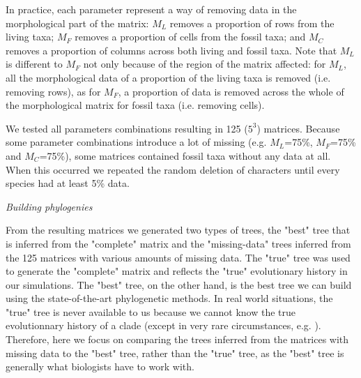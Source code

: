 \documentclass[12pt,letterpaper]{article}
\renewcommand{\subsection}[1]{%
\bigskip
\begin{center}
\begin{large}
\normalfont\itshape #1
\end{large}
\end{center}}
\begin{document}
In practice, each parameter represent a way of removing data in the morphological part of the matrix: $M_{L}$ removes a proportion of rows from the living taxa; $M_{F}$ removes a proportion of cells from the fossil taxa; and $M_{C}$ removes a proportion of columns across both living and fossil taxa.
Note that $M_{L}$ is different to $M_{F}$ not only because of the region of the matrix affected: for $M_{L}$, all the morphological data of a proportion of the living taxa is removed (i.e. removing rows), as for $M_{F}$, a proportion of data is removed across the whole of the morphological matrix for fossil taxa (i.e. removing cells).

We tested all parameters combinations resulting in 125 ($5^3$) matrices.
Because some parameter combinations introduce a lot of missing (e.g. $M_L$=75\%, $M_F$=75\% and $M_C$=75\%), some matrices contained fossil taxa without any data at all.
When this occurred we repeated the random deletion of characters until every species had at least 5\% data.

\subsection{Building phylogenies}
From the resulting matrices we generated two types of trees, the "best" tree that is inferred from the "complete" matrix and the "missing-data" trees inferred from the 125 matrices with various amounts of missing data.
The "true" tree was used to generate the "complete" matrix and reflects the "true" evolutionary history in our simulations.
The "best" tree, on the other hand, is the best tree we can build using the state-of-the-art phylogenetic methods.
In real world situations, the "true" tree is never available to us because we cannot know the true evolutionnary history of a clade (except in very rare circumstances, e.g. \citet{rozen2005}).
Therefore, here we focus on comparing the trees inferred from the matrices with missing data to the "best" tree, rather than the "true" tree, as the "best" tree is generally what biologists have to work with.
\end{document}
